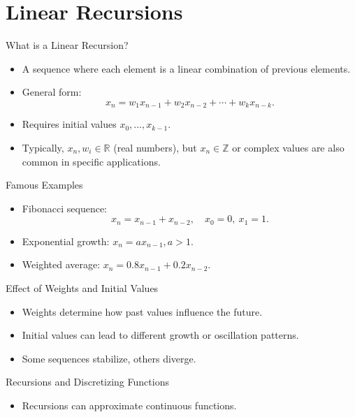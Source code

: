\documentclass{beamer}
\begin{document}
\section{Linear Recursions}
\begin{frame}{What is a Linear Recursion?}
\begin{itemize}
  \item A sequence where each element is a linear combination of previous elements.
  \item General form:
  \begin{equation}
    x_n = w_1 x_{n-1} + w_2 x_{n-2} + \cdots + w_k x_{n-k}.
  \end{equation}
  \item Requires initial values \( x_0, \dots, x_{k-1} \).
  \item Typically, \( x_n, w_i \in \mathbb{R} \) (real numbers), but \( x_n \in \mathbb{Z} \) or complex values are also common in specific applications.
\end{itemize}
\end{frame}

\begin{frame}{Famous Examples}
\begin{itemize}
  \item Fibonacci sequence:
  \begin{equation}
    x_n = x_{n-1} + x_{n-2}, \quad x_0 = 0,\ x_1 = 1.
  \end{equation}
  \item Exponential growth: \( x_n = a x_{n-1}, a > 1. \)
  \item Weighted average: \( x_n = 0.8 x_{n-1} + 0.2 x_{n-2} \).
\end{itemize}
\end{frame}

\begin{frame}{Effect of Weights and Initial Values}
\begin{itemize}
  \item Weights determine how past values influence the future.
  \item Initial values can lead to different growth or oscillation patterns.
  \item Some sequences stabilize, others diverge.
\end{itemize}
\end{frame}

\begin{frame}{Recursions and Discretizing Functions}
\begin{itemize}
  \item Recursions can approximate continuous functions.
\end{itemize}
\end{frame}
\end{document}
